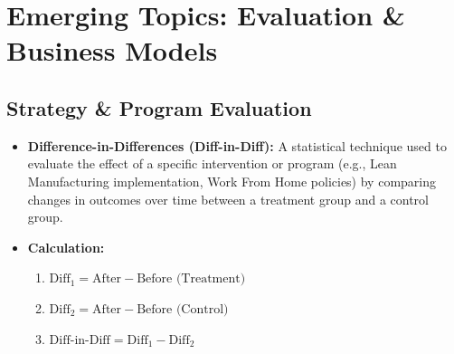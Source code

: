 \section{Emerging Topics: Evaluation \& Business Models}

\subsection*{Strategy \& Program Evaluation}
\begin{itemize}
    \item \textbf{Difference-in-Differences (Diff-in-Diff):} A statistical technique used to
          evaluate the effect of a specific intervention or program (e.g., Lean
          Manufacturing implementation, Work From Home policies) by comparing changes in
          outcomes over time between a treatment group and a control group.
    \item \textbf{Calculation:}
          \begin{enumerate}
              \item $\text{Diff}_1 = \text{After} - \text{Before (Treatment)}$
              \item $\text{Diff}_2 = \text{After} - \text{Before (Control)}$
              \item $\text{Diff-in-Diff} = \text{Diff}_1 - \text{Diff}_2$
          \end{enumerate}
\end{itemize}

